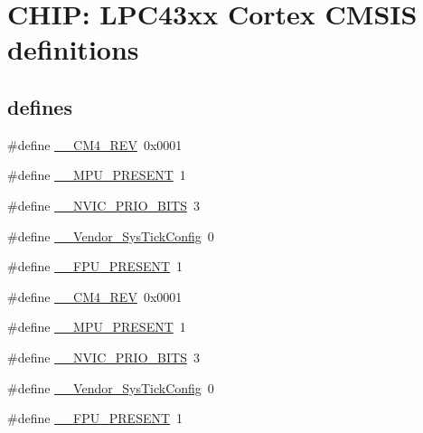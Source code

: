 \hypertarget{group___c_m_s_i_s__43_x_x___c_o_m_m_o_n}{}\section{C\+H\+IP\+: L\+P\+C43xx Cortex C\+M\+S\+IS definitions}
\label{group___c_m_s_i_s__43_x_x___c_o_m_m_o_n}
\subsection*{\textquotesingle{}defines\textquotesingle{}}
\begin{DoxyCompactItemize}
\item 
\#define \hyperlink{group___c_m_s_i_s__43_x_x___c_o_m_m_o_n_ga45a97e4bb8b6ce7c334acc5f45ace3ba}{\+\_\+\+\_\+\+C\+M4\+\_\+\+R\+EV}~0x0001
\item 
\#define \hyperlink{group___c_m_s_i_s__43_x_x___c_o_m_m_o_n_ga4127d1b31aaf336fab3d7329d117f448}{\+\_\+\+\_\+\+M\+P\+U\+\_\+\+P\+R\+E\+S\+E\+NT}~1
\item 
\#define \hyperlink{group___c_m_s_i_s__43_x_x___c_o_m_m_o_n_gae3fe3587d5100c787e02102ce3944460}{\+\_\+\+\_\+\+N\+V\+I\+C\+\_\+\+P\+R\+I\+O\+\_\+\+B\+I\+TS}~3
\item 
\#define \hyperlink{group___c_m_s_i_s__43_x_x___c_o_m_m_o_n_gab58771b4ec03f9bdddc84770f7c95c68}{\+\_\+\+\_\+\+Vendor\+\_\+\+Sys\+Tick\+Config}~0
\item 
\#define \hyperlink{group___c_m_s_i_s__43_x_x___c_o_m_m_o_n_gac1ba8a48ca926bddc88be9bfd7d42641}{\+\_\+\+\_\+\+F\+P\+U\+\_\+\+P\+R\+E\+S\+E\+NT}~1
\item 
\#define \hyperlink{group___c_m_s_i_s__43_x_x___c_o_m_m_o_n_ga45a97e4bb8b6ce7c334acc5f45ace3ba}{\+\_\+\+\_\+\+C\+M4\+\_\+\+R\+EV}~0x0001
\item 
\#define \hyperlink{group___c_m_s_i_s__43_x_x___c_o_m_m_o_n_ga4127d1b31aaf336fab3d7329d117f448}{\+\_\+\+\_\+\+M\+P\+U\+\_\+\+P\+R\+E\+S\+E\+NT}~1
\item 
\#define \hyperlink{group___c_m_s_i_s__43_x_x___c_o_m_m_o_n_gae3fe3587d5100c787e02102ce3944460}{\+\_\+\+\_\+\+N\+V\+I\+C\+\_\+\+P\+R\+I\+O\+\_\+\+B\+I\+TS}~3
\item 
\#define \hyperlink{group___c_m_s_i_s__43_x_x___c_o_m_m_o_n_gab58771b4ec03f9bdddc84770f7c95c68}{\+\_\+\+\_\+\+Vendor\+\_\+\+Sys\+Tick\+Config}~0
\item 
\#define \hyperlink{group___c_m_s_i_s__43_x_x___c_o_m_m_o_n_gac1ba8a48ca926bddc88be9bfd7d42641}{\+\_\+\+\_\+\+F\+P\+U\+\_\+\+P\+R\+E\+S\+E\+NT}~1
\end{DoxyCompactItemize}


